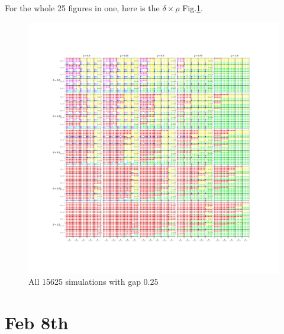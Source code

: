 \documentclass{article}
\begin{document}
For the whole 25 figures in one, here is the $\delta \times \rho$ Fig.\ref{fig:all025}.

\begin{figure}
    \centering
    \includegraphics[width=\textwidth]{All_gap025.png}
    \caption{All 15625 simulations with gap $0.25$}
    \label{fig:all025}
\end{figure}

\section{Feb 8th}
\end{document}

